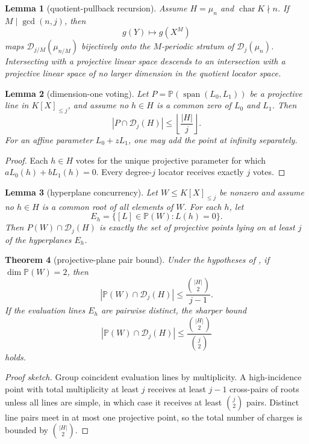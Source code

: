 \documentclass[11pt]{article}
\newtheorem{theorem}{Theorem}[section]
\newtheorem{lemma}[theorem]{Lemma}
\theoremstyle{definition}
\theoremstyle{remark}
\newcommand{\D}{\mathcal D}
\newcommand{\PP}{\mathbb P}
\newcommand{\Span}{\operatorname{span}}
\newcommand{\floor}[1]{\left\lfloor #1\right\rfloor}
\begin{document}
\begin{lemma}[quotient-pullback recursion]\label{lem:quot-pullback}
Assume $H=\mu_n$ and $\operatorname{char}K\nmid n$.  If $M\mid\gcd(n,j)$, then
\[
        g(Y)\longmapsto g(X^M)
\]
maps $\D_{j/M}(\mu_{n/M})$ bijectively onto the $M$-periodic stratum of
$\D_j(\mu_n)$.  Intersecting with a projective linear space descends to an
intersection with a projective linear space of no larger dimension in the
quotient locator space.
\end{lemma}

\begin{lemma}[dimension-one voting]\label{lem:dim1}
Let $P=\PP(\Span(L_0,L_1))$ be a projective line in $K[X]_{\le j}$, and assume
no $h\in H$ is a common zero of $L_0$ and $L_1$.  Then
\[
        |P\cap \D_j(H)|\le \floor{\frac{|H|}{j}}.
\]
For an affine parameter $L_0+zL_1$, one may add the point at infinity
separately.
\end{lemma}

\begin{proof}
Each $h\in H$ votes for the unique projective parameter for which
$aL_0(h)+bL_1(h)=0$.  Every degree-$j$ locator receives exactly $j$ votes.
\end{proof}

\begin{lemma}[hyperplane concurrency]\label{lem:concurrency}
Let $W\le K[X]_{\le j}$ be nonzero and assume no $h\in H$ is a common root of
all elements of $W$.  For each $h$, let
\[
        E_h=\{[L]\in\PP(W): L(h)=0\}.
\]
Then $P(W)\cap \D_j(H)$ is exactly the set of projective points lying on at
least $j$ of the hyperplanes $E_h$.
\end{lemma}

\begin{theorem}[projective-plane pair bound]\label{thm:dim2}
Under the hypotheses of , if $\dim \PP(W)=2$, then
\[
        |\PP(W)\cap \D_j(H)|
        \le
        \frac{\binom{|H|}{2}}{j-1}.
\]
If the evaluation lines $E_h$ are pairwise distinct, the sharper bound
\[
        |\PP(W)\cap \D_j(H)|
        \le
        \frac{\binom{|H|}{2}}{\binom{j}{2}}
\]
holds.
\end{theorem}

\begin{proof}[Proof sketch]
Group coincident evaluation lines by multiplicity.  A high-incidence point
with total multiplicity at least $j$ receives at least $j-1$ cross-pairs of
roots unless all lines are simple, in which case it receives at least
$\binom j2$ pairs.  Distinct line pairs meet in at most one projective point,
so the total number of charges is bounded by $\binom{|H|}{2}$.
\end{proof}
\end{document}
